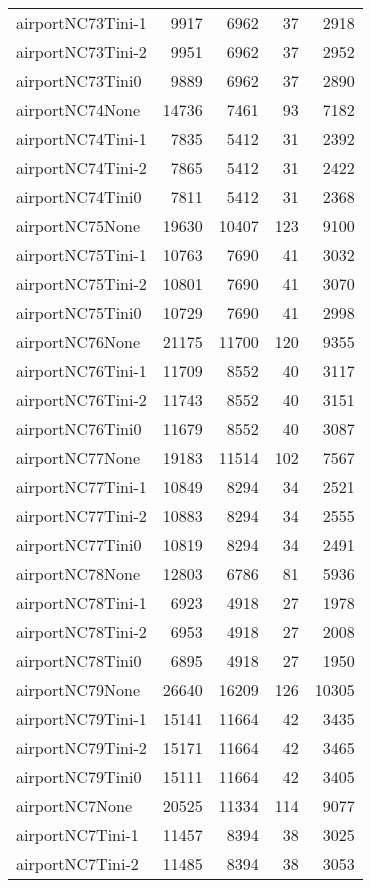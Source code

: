 \begin{longtable}{lrrrr}
airportNC73Tini-1 & 9917 & 6962 & 37 & 2918 \\
airportNC73Tini-2 & 9951 & 6962 & 37 & 2952 \\
airportNC73Tini0 & 9889 & 6962 & 37 & 2890 \\
airportNC74None & 14736 & 7461 & 93 & 7182 \\
airportNC74Tini-1 & 7835 & 5412 & 31 & 2392 \\
airportNC74Tini-2 & 7865 & 5412 & 31 & 2422 \\
airportNC74Tini0 & 7811 & 5412 & 31 & 2368 \\
airportNC75None & 19630 & 10407 & 123 & 9100 \\
airportNC75Tini-1 & 10763 & 7690 & 41 & 3032 \\
airportNC75Tini-2 & 10801 & 7690 & 41 & 3070 \\
airportNC75Tini0 & 10729 & 7690 & 41 & 2998 \\
airportNC76None & 21175 & 11700 & 120 & 9355 \\
airportNC76Tini-1 & 11709 & 8552 & 40 & 3117 \\
airportNC76Tini-2 & 11743 & 8552 & 40 & 3151 \\
airportNC76Tini0 & 11679 & 8552 & 40 & 3087 \\
airportNC77None & 19183 & 11514 & 102 & 7567 \\
airportNC77Tini-1 & 10849 & 8294 & 34 & 2521 \\
airportNC77Tini-2 & 10883 & 8294 & 34 & 2555 \\
airportNC77Tini0 & 10819 & 8294 & 34 & 2491 \\
airportNC78None & 12803 & 6786 & 81 & 5936 \\
airportNC78Tini-1 & 6923 & 4918 & 27 & 1978 \\
airportNC78Tini-2 & 6953 & 4918 & 27 & 2008 \\
airportNC78Tini0 & 6895 & 4918 & 27 & 1950 \\
airportNC79None & 26640 & 16209 & 126 & 10305 \\
airportNC79Tini-1 & 15141 & 11664 & 42 & 3435 \\
airportNC79Tini-2 & 15171 & 11664 & 42 & 3465 \\
airportNC79Tini0 & 15111 & 11664 & 42 & 3405 \\
airportNC7None & 20525 & 11334 & 114 & 9077 \\
airportNC7Tini-1 & 11457 & 8394 & 38 & 3025 \\
airportNC7Tini-2 & 11485 & 8394 & 38 & 3053 \\

\end{longtable}
